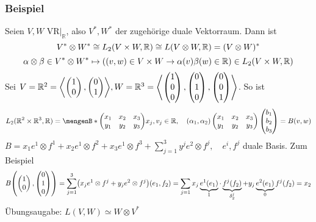 \subsubsection{Beispiel}
\label{ssub:171}
Seien $V,W$ VR$\vert_{\mathds{R}}$, also $V^*,W^*$ der zugehörige duale Vektorraum. Dann ist
\[
V^* \otimes W^* \cong L_2\enbrace{V\times W,\mathds{R}} \cong L\enbrace{V\otimes W,\mathds{R}} = \enbrace{V\otimes W}^*
\]
\[
\alpha \otimes \beta \in V^* \otimes W^* \mapsto \enbrace*{(v,w)\in V\times W \to \alpha(v)\beta(w) \in \mathds{R}} \in L_2 \enbrace{V\times W,\mathds{R}}
\]
Sei $V = \mathds{R}^2 = \lenbrace*{\begin{pmatrix}1\\0\end{pmatrix},\begin{pmatrix}0\\1\end{pmatrix}}, 
W = \mathds{R}^3 = 
\lenbrace*{\begin{pmatrix}1\\0\\0\end{pmatrix},\begin{pmatrix}0\\1\\0\end{pmatrix},\begin{pmatrix}0\\0\\1\end{pmatrix}
}
$. So ist 
\[L_2\enbrace{\mathds{R}^2\times \mathds{R}^3,\mathds{R}} = \set[
\begin{pmatrix}
x_1 & x_2 & x_3\\
y_1 & y_2 & y_3
\end{pmatrix}]{x_j,v_j \in \mathds{R}},\quad
(\alpha_1,\alpha_2)\begin{pmatrix}
x_1 & x_2 & x_3\\
y_1 & y_2 & y_3
\end{pmatrix}\begin{pmatrix}b_1\\b_2\\b_3\end{pmatrix} = B(v,w)
\]
$B = x_1 e^1\otimes f^1 + x_2 e^1\otimes f^2 + x_3 e^1\otimes f^3 + \sum_{j=1}^3 y^j e^2\otimes f^j,\quad e^i,f^j$ duale Basis. Zum Beispiel
\[
B\enbrace*{\begin{pmatrix}1\\0\end{pmatrix},\begin{pmatrix}0\\1\\0\end{pmatrix}} = \sum_{j=1}^3 \enbrace*{x_j e^1\otimes f^j + y_j e^2\otimes f^j}(e_1,f_2) = \sum_{j=1} x_j \underbrace{e^1(e_1)}_{1}\cdot \underbrace{f^j(f_2)}_{\delta_2^j} + y_j \underbrace{e^2(e_1)}_{0} f^j(f_2) = x_2
\]
Übungsaugabe: $L(V,W) \simeq W\otimes V^*$

